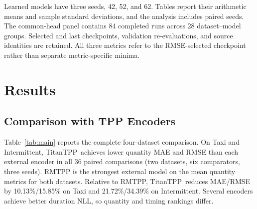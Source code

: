 \documentclass[runningheads]{llncs}
\newcommand{\method}{TitanTPP}
\begin{document}
Learned models have three seeds, 42, 52, and 62. Tables report their arithmetic
means and sample standard deviations, and the analysis includes paired seeds.
The common-head panel contains 84 completed runs across 28 dataset--model
groups. Selected and last checkpoints, validation re-evaluations, and source
identities are retained. All three metrics refer to the RMSE-selected
checkpoint rather than separate metric-specific minima.

\section{Results}
\subsection{Comparison with TPP Encoders}
Table~\ref{tab:main} reports the complete four-dataset comparison. On Taxi
and Intermittent, \method\ achieves lower quantity MAE and RMSE than each
external encoder in all 36 paired comparisons (two datasets, six comparators,
three seeds). RMTPP is the strongest external model on the mean quantity
metrics for both datasets. Relative to RMTPP, \method\ reduces MAE/RMSE by
10.13\%/15.85\% on Taxi and 21.72\%/34.39\% on Intermittent. Several encoders
achieve better duration NLL, so quantity and timing rankings differ.
\end{document}
